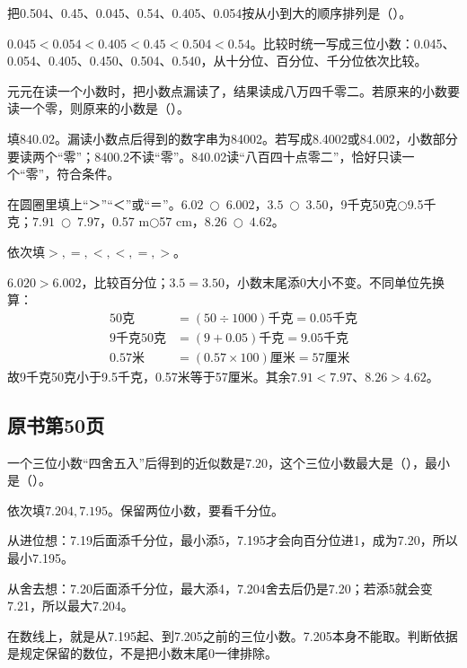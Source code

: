 把0.504、0.45、0.045、0.54、0.405、0.054按从小到大的顺序排列是（\hspace{1.8em}）。\par
\begin{BookAnswer}
\(0.045<0.054<0.405<0.45<0.504<0.54\)。比较时统一写成三位小数：0.045、0.054、0.405、0.450、0.504、0.540，从十分位、百分位、千分位依次比较。
\end{BookAnswer}

元元在读一个小数时，把小数点漏读了，结果读成八万四千零二。若原来的小数要读一个零，则原来的小数是（\hspace{1.8em}）。\par
\begin{BookAnswer}
填\(840.02\)。漏读小数点后得到的数字串为84002。若写成8.4002或84.002，小数部分要读两个“零”；8400.2不读“零”。840.02读“八百四十点零二”，恰好只读一个“零”，符合条件。
\end{BookAnswer}

在圆圈里填上“＞”“＜”或“＝”。\(6.02\ \bigcirc\ 6.002\)，\allowbreak{}\(3.5\ \bigcirc\ 3.50\)，9千克50克\(\bigcirc\)9.5千克；\allowbreak{}\(7.91\ \bigcirc\ 7.97\)，0.57 m\(\bigcirc\)57 cm，\allowbreak{}\(8.26\ \bigcirc\ 4.62\)。\par
\begin{BookAnswer}
依次填\(>,=,<,<,=,>\)。\par \(6.020>6.002\)，比较百分位；\allowbreak{}\(3.5=3.50\)，小数末尾添0大小不变。不同单位先换算：\[\begin{aligned}50\text{克}&=(50\div1000)\text{千克}=0.05\text{千克}\\9\text{千克}50\text{克}&=(9+0.05)\text{千克}=9.05\text{千克}\\0.57\text{米}&=(0.57\times100)\text{厘米}=57\text{厘米}\end{aligned}\]故9千克50克小于9.5千克，0.57米等于57厘米。其余\(7.91<7.97\)、\(8.26>4.62\)。
\end{BookAnswer}



\subsection*{原书第50页}

一个三位小数“四舍五入”后得到的近似数是7.20，这个三位小数最大是（\hspace{1.8em}），最小是（\hspace{1.8em}）。\par
\begin{BookAnswer}
依次填\(7.204,7.195\)。保留两位小数，要看千分位。\par 从进位想：7.19后面添千分位，最小添5，7.195才会向百分位进1，成为7.20，所以最小7.195。\par 从舍去想：7.20后面添千分位，最大添4，7.204舍去后仍是7.20；若添5就会变7.21，所以最大7.204。\par 在数线上，就是从7.195起、到7.205之前的三位小数。7.205本身不能取。判断依据是规定保留的数位，不是把小数末尾0一律排除。
\end{BookAnswer}

